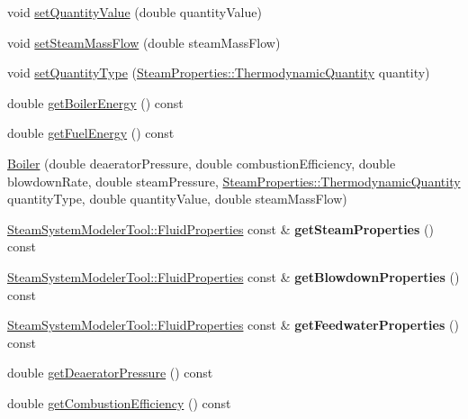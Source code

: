 \begin{DoxyCompactItemize}
\item 
void \hyperlink{class_boiler_ac3450d88dba124529d59baf62c39e14a}{set\+Quantity\+Value} (double quantity\+Value)
\item 
void \hyperlink{class_boiler_ada7af5896a2a4701d78a532dc9bc9892}{set\+Steam\+Mass\+Flow} (double steam\+Mass\+Flow)
\item 
void \hyperlink{class_boiler_a9c5b20cae6133c9174b12760f36d52c2}{set\+Quantity\+Type} (\hyperlink{class_steam_properties_ae0294bedf7d178c2d8fb6aed0f62fbff}{Steam\+Properties\+::\+Thermodynamic\+Quantity} quantity)
\item 
double \hyperlink{class_boiler_a8cc9ad5f1b36f5dcbcb225e9e3d13a39}{get\+Boiler\+Energy} () const
\item 
double \hyperlink{class_boiler_a55542a761669c842163b20932f9747d3}{get\+Fuel\+Energy} () const
\item 
\hyperlink{class_boiler_adebe1dca06edc8dbca462e226b4dd9d5}{Boiler} (double deaerator\+Pressure, double combustion\+Efficiency, double blowdown\+Rate, double steam\+Pressure, \hyperlink{class_steam_properties_ae0294bedf7d178c2d8fb6aed0f62fbff}{Steam\+Properties\+::\+Thermodynamic\+Quantity} quantity\+Type, double quantity\+Value, double steam\+Mass\+Flow)
\item 
\mbox{\label{class_boiler_a47e660b470ef7c2749102ae6873922e1}} 
\hyperlink{struct_steam_system_modeler_tool_1_1_fluid_properties}{Steam\+System\+Modeler\+Tool\+::\+Fluid\+Properties} const  \& {\bfseries get\+Steam\+Properties} () const
\item 
\mbox{\label{class_boiler_ac48aa3ee13845cdf388085e73531cb66}} 
\hyperlink{struct_steam_system_modeler_tool_1_1_fluid_properties}{Steam\+System\+Modeler\+Tool\+::\+Fluid\+Properties} const  \& {\bfseries get\+Blowdown\+Properties} () const
\item 
\mbox{\label{class_boiler_a03e09f9469c746789f302c42c8dfe959}} 
\hyperlink{struct_steam_system_modeler_tool_1_1_fluid_properties}{Steam\+System\+Modeler\+Tool\+::\+Fluid\+Properties} const  \& {\bfseries get\+Feedwater\+Properties} () const
\item 
double \hyperlink{class_boiler_aad4786e7b68084e65a35dd6235517b8c}{get\+Deaerator\+Pressure} () const
\item 
double \hyperlink{class_boiler_a21c7423b756761c3216704b3f554feff}{get\+Combustion\+Efficiency} () const

\end{DoxyCompactItemize}
